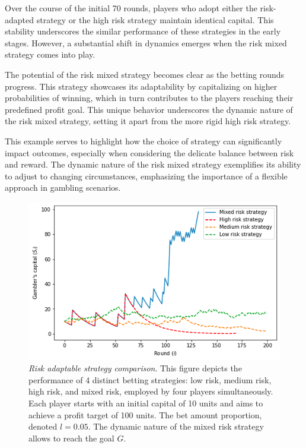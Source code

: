 \documentclass[11pt,twoside]{article}
\numberwithin{Theorem}{section}
\numberwithin{Definition}{section}
\numberwithin{Lemma}{section}
\numberwithin{Algorithm}{section}
\numberwithin{equation}{section}
\begin{document}
Over the course of the initial 70 rounds, players who adopt either the risk-adapted strategy or the high risk strategy maintain identical capital. This stability underscores the similar performance of these strategies in the early stages. However, a substantial shift in dynamics emerges when the risk mixed strategy comes into play.

The potential of the risk mixed strategy becomes clear as the betting rounds progress. This strategy showcases its adaptability by capitalizing on higher probabilities of winning, which in turn contributes to the players reaching their predefined profit goal. This unique behavior underscores the dynamic nature of the risk mixed strategy, setting it apart from the more rigid high risk strategy.

This example serves to highlight how the choice of strategy can significantly impact outcomes, especially when considering the delicate balance between risk and reward. The dynamic nature of the risk mixed strategy exemplifies its ability to adjust to changing circumstances, emphasizing the importance of a flexible approach in gambling scenarios.


\begin{figure}[H]
        \centering
        \includegraphics[width=13cm]{comparison_final.png}
        \caption[Risk adaptable strategy comparison]{\textit{Risk adaptable strategy comparison}. This figure depicts the performance of 4 distinct betting strategies: low risk, medium risk, high risk, and mixed risk, employed by four players simultaneously. Each player starts with an initial capital of 10 units and aims to achieve a profit target of 100 units. The bet amount proportion, denoted $l = 0.05$. The dynamic nature of the mixed risk strategy allows to reach the goal $G$.}\label{graf:final_graph}
\end{figure}
\end{document}
